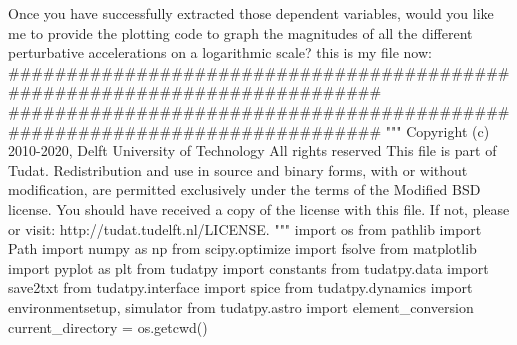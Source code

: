 {}\markdownRendererThematicBreak{}\markdownRendererInterblockSeparator
{}Once you have successfully extracted those dependent variables, would you like me to provide the plotting code to graph the magnitudes of all the different perturbative accelerations on a logarithmic scale?\markdownRendererInterblockSeparator
{}\markdownRendererThematicBreak{}\markdownRendererInterblockSeparator
{}
\markdownRendererSectionEnd 
\markdownRendererSectionEnd \markdownRendererSectionBegin
{}\markdownRendererInterblockSeparator
{}this is my file now:\markdownRendererInterblockSeparator
{}###########################################################################\markdownRendererInterblockSeparator
{}
\markdownRendererSectionEnd 
\markdownRendererSectionEnd \markdownRendererSectionBegin
\markdownRendererHeadingOne{}\markdownRendererInterblockSeparator
{}
\markdownRendererSectionEnd \markdownRendererSectionBegin
{}\markdownRendererInterblockSeparator
{}
\markdownRendererSectionEnd \markdownRendererSectionBegin
\markdownRendererHeadingOne{}\markdownRendererInterblockSeparator
{}
\markdownRendererSectionEnd \markdownRendererSectionBegin
{}\markdownRendererInterblockSeparator
{}
\markdownRendererSectionEnd \markdownRendererSectionBegin
\markdownRendererHeadingOne{}\markdownRendererInterblockSeparator
{}########################################################################### """ Copyright (c) 2010-2020, Delft University of Technology All rights reserved This file is part of Tudat. Redistribution and use in source and binary forms, with or without modification, are permitted exclusively under the terms of the Modified BSD license. You should have received a copy of the license with this file. If not, please or visit: http://tudat.tudelft.nl/LICENSE. """ import os from pathlib import Path import numpy as np from scipy.optimize import fsolve from matplotlib import pyplot as plt from tudatpy import constants from tudatpy.data import save2txt from tudatpy.interface import spice from tudatpy.dynamics import environmentsetup, simulator from tudatpy.astro import element_conversion\markdownRendererInterblockSeparator
{}
\markdownRendererSectionEnd \markdownRendererSectionBegin
{}\markdownRendererInterblockSeparator
{}current_directory = os.getcwd()\markdownRendererInterblockSeparator
{}
\markdownRendererSectionEnd \markdownRendererSectionBegin
